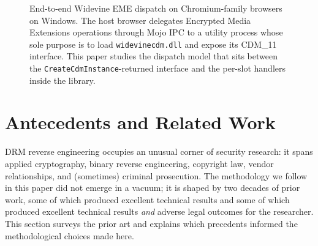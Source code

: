 \documentclass[11pt,letterpaper]{article}
\begin{document}
\begin{figure}[t]
\centering
{}
\caption{End-to-end Widevine EME dispatch on Chromium-family browsers
on Windows. The host browser delegates Encrypted Media Extensions
operations through Mojo IPC to a utility process whose sole purpose is
to load \texttt{widevinecdm.dll} and expose its CDM\_11 interface.
This paper studies the dispatch model that sits between the
\texttt{CreateCdmInstance}-returned interface and the per-slot
handlers inside the library.}
\label{fig:system-overview}
\end{figure}

\section{Antecedents and Related Work}
\label{sec:antecedents}

DRM reverse engineering occupies an unusual corner of security
research: it spans applied cryptography, binary reverse engineering,
copyright law, vendor relationships, and (sometimes) criminal
prosecution. The methodology we follow in this paper did not emerge
in a vacuum; it is shaped by two decades of prior work, some of
which produced excellent technical results and some of which
produced excellent technical results \emph{and} adverse legal
outcomes for the researcher. This section surveys the prior art and
explains which precedents informed the methodological choices made
here.
\end{document}
